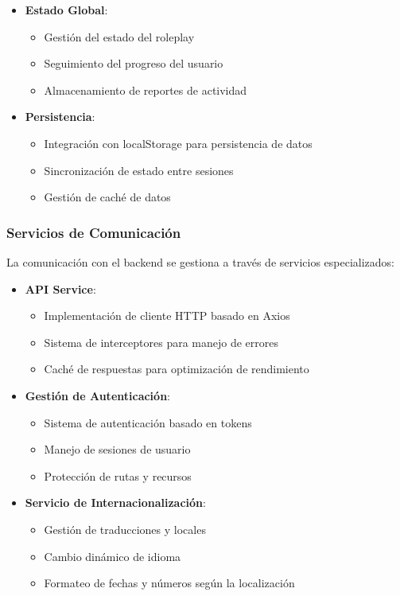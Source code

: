 \begin{itemize}
	\item \textbf{Estado Global}:
	      \begin{itemize}
		      \item Gestión del estado del roleplay
		      \item Seguimiento del progreso del usuario
		      \item Almacenamiento de reportes de actividad
	      \end{itemize}

	\item \textbf{Persistencia}:
	      \begin{itemize}
		      \item Integración con localStorage para persistencia de datos
		      \item Sincronización de estado entre sesiones
		      \item Gestión de caché de datos
	      \end{itemize}
\end{itemize}

\subsubsection{Servicios de Comunicación}
\label{servicios-comunicacion}

La comunicación con el backend se gestiona a través de servicios especializados:

\begin{itemize}
	\item \textbf{API Service}:
	      \begin{itemize}
		      \item Implementación de cliente HTTP basado en Axios
		      \item Sistema de interceptores para manejo de errores
		      \item Caché de respuestas para optimización de rendimiento
	      \end{itemize}

	\item \textbf{Gestión de Autenticación}:
	      \begin{itemize}
		      \item Sistema de autenticación basado en tokens
		      \item Manejo de sesiones de usuario
		      \item Protección de rutas y recursos
	      \end{itemize}

	\item \textbf{Servicio de Internacionalización}:
	      \begin{itemize}
		      \item Gestión de traducciones y locales
		      \item Cambio dinámico de idioma
		      \item Formateo de fechas y números según la localización
	      \end{itemize}
\end{itemize}


